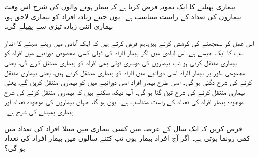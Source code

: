 بیماری  پھیلنے  کا ایک نمونہ فرض کرتا ہے کہ بیمار ہونے والوں کی شرح  اس وقت  بیماروں   کی تعداد  کے راست متناسب ہے۔ یوں جتنے زیادہ افراد کو بیماری لاحق ہو، بیماری اتنی زیادہ تیزی سے پھیلے گی۔

اس عمل کو سمجھنے کی کوشش کرتے ہیں۔ہم فرض کرتے ہیں کہ ایک آبادی میں رہنے سہنے  کا انداز سب کا ایک جیسے ہے۔اس آبادی میں  اگر    بیمار  افراد  کی ٹولی کسی مخصوص  دورانیے میں     افراد کو   بیماری منتقل کرتی ہو تب     بیماروں  کی دوسری  ٹولی  بھی    افراد کو بیماری منتقل کرے گی، یعنی  مجموعی طور پر  بیمار افراد  اسی دورانیے میں  افراد کو بیماری منتقل کرتے ہیں، یعنی  بیماری منتقل کرنے کی شرح دگنی ہو گی۔ اسی طرح  بیمار افراد  اسی دورانیے میں   کو   بیماری منتقل کریں گے، یعنی بیماری منتقل کرنے کی شرح تین گنا ہو گی۔ آپ دیکھ سکتے ہیں کہ  بیماری منتقل کرنے کی شرح موجودہ  بیمار افراد  کی تعداد کے راست متناسب ہے۔ یوں  ہو گا، جہاں بیماروں کی  موجودہ تعداد  اور   بیماری پھیلنے  کی شرح  ہے۔

فرض کریں کہ ایک سال کے عرصہ میں کسی بیماری میں مبتلا افراد کی تعداد میں  کمی رونما ہوتی ہے۔ اگر آج  افراد بیمار ہوں تب کتنے سالوں میں بیمار افراد کی تعداد  ہو گی؟


